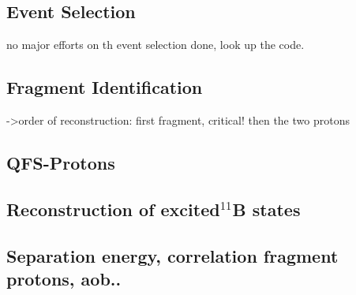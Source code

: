 \subsection{Event Selection}
no major efforts on th event selection done, look up the code.
\subsection{Fragment Identification}
->order of reconstruction: first fragment, critical! then the two protons

\subsection{QFS-Protons}

\subsection{Reconstruction of excited$ ^{11}$B states}

\subsection{Separation energy, correlation fragment protons, aob..}
